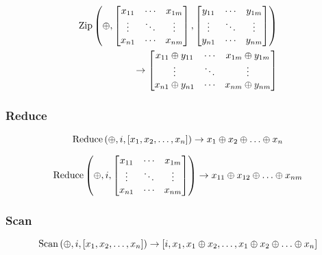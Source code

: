 \begin{equation}
\begin{split}
\operatorname*{Zip} \left( \oplus,
\begin{bmatrix}
  x_{11} & \cdots & x_{1m} \\
  \vdots & \ddots & \vdots \\
  x_{n1} & \cdots & x_{nm}
\end{bmatrix},
\begin{bmatrix}
  y_{11} & \cdots & y_{1m} \\
  \vdots & \ddots & \vdots \\
  y_{n1} & \cdots & y_{nm}
\end{bmatrix} \right) \\
\to
\begin{bmatrix}
  x_{11} \oplus y_{11} & \cdots & x_{1m} \oplus y_{1m} \\
  \vdots & \ddots & \vdots \\
  x_{n1} \oplus y_{n1} & \cdots & x_{nm} \oplus y_{nm}
\end{bmatrix}
\end{split}
\end{equation}

\subsubsection{Reduce}

\begin{equation}
\operatorname*{Reduce} \left( \oplus, i, [x_1,x_2,\ldots,x_n] \right)
\to
x_1 \oplus x_2 \oplus \ldots \oplus x_n
\end{equation}

\begin{equation}
\operatorname*{Reduce} \left( \oplus, i,
\begin{bmatrix}
  x_{11} & \cdots & x_{1m} \\
  \vdots & \ddots & \vdots \\
  x_{n1} & \cdots & x_{nm}
\end{bmatrix} \right)
\to
x_{11} \oplus x_{12} \oplus \ldots \oplus x_{nm}
\end{equation}

\subsubsection{Scan}

\begin{equation}
\operatorname*{Scan} \left( \oplus, i, [x_1,x_2,\ldots,x_n] \right)
\to
\left[ i, x_1, x_1 \oplus x_2, \ldots, x_1 \oplus x_2 \oplus \ldots \oplus x_n \right]
\end{equation}

